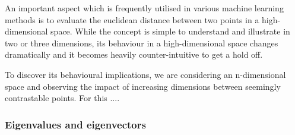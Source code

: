 An important aspect which is frequently utilised in various machine learning methods is to evaluate the euclidean distance between two points in a high-dimensional space.
While the concept is simple to understand and illustrate in two or three dimensions, its behaviour in a high-dimensional space changes dramatically and it becomes heavily counter-intuitive to get a hold off.

To discover its behavioural implications, we are considering an n-dimensional space and observing the impact of increasing dimensions between seemingly contrastable points. 
For this .... 

\subsubsection{Eigenvalues and eigenvectors}


